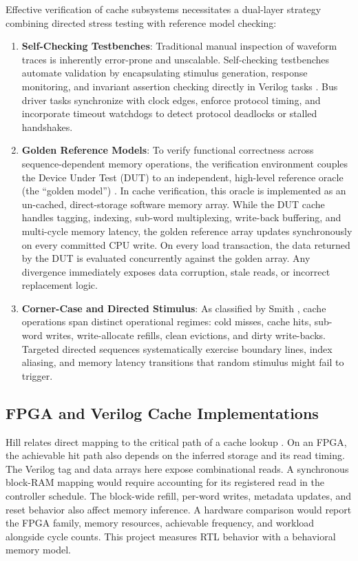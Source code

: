 \documentclass[conference]{IEEEtran}
\begin{document}
Effective verification of cache subsystems necessitates a dual-layer strategy combining directed stress testing with reference model checking:
\begin{enumerate}
    \item \textbf{Self-Checking Testbenches}: Traditional manual inspection of waveform traces is inherently error-prone and unscalable. Self-checking testbenches automate validation by encapsulating stimulus generation, response monitoring, and invariant assertion checking directly in Verilog tasks \cite{patterson2020computer}. Bus driver tasks synchronize with clock edges, enforce protocol timing, and incorporate timeout watchdogs to detect protocol deadlocks or stalled handshakes.
    \item \textbf{Golden Reference Models}: To verify functional correctness across sequence-dependent memory operations, the verification environment couples the Device Under Test (DUT) to an independent, high-level reference oracle (the ``golden model'') \cite{hennessy2019computer}. In cache verification, this oracle is implemented as an un-cached, direct-storage software memory array. While the DUT cache handles tagging, indexing, sub-word multiplexing, write-back buffering, and multi-cycle memory latency, the golden reference array updates synchronously on every committed CPU write. On every load transaction, the data returned by the DUT is evaluated concurrently against the golden array. Any divergence immediately exposes data corruption, stale reads, or incorrect replacement logic.
    \item \textbf{Corner-Case and Directed Stimulus}: As classified by Smith \cite{smith1982cache}, cache operations span distinct operational regimes: cold misses, cache hits, sub-word writes, write-allocate refills, clean evictions, and dirty write-backs. Targeted directed sequences systematically exercise boundary lines, index aliasing, and memory latency transitions that random stimulus might fail to trigger.
\end{enumerate}

\subsection{FPGA and Verilog Cache Implementations}
Hill relates direct mapping to the critical path of a cache lookup \cite{hill1988case}. On an FPGA, the achievable hit path also depends on the inferred storage and its read timing. The Verilog tag and data arrays here expose combinational reads. A synchronous block-RAM mapping would require accounting for its registered read in the controller schedule. The block-wide refill, per-word writes, metadata updates, and reset behavior also affect memory inference. A hardware comparison would report the FPGA family, memory resources, achievable frequency, and workload alongside cycle counts. This project measures RTL behavior with a behavioral memory model.
\end{document}
